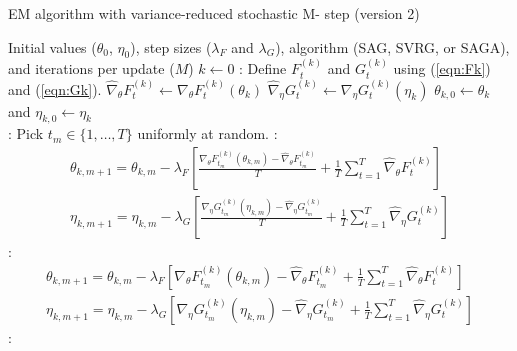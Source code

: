 \begin{algorithm}
\caption{EM algorithm with variance-reduced stochastic M- step (version 2)}\label{alg:EM-SO-v2}
\begin{algorithmic}[1]
\Require Initial values ($\theta_{0}$, $\eta_{0}$), step sizes ($\lambda_F$ and $\lambda_G$), algorithm (SAG, SVRG, or SAGA), and iterations per update ($M$)
%
\State $k \leftarrow 0$
%
:
    \State Define $F_t^{(k)}$ and $G_t^{(k)}$ using (\ref{eqn:Fk}) and (\ref{eqn:Gk}). 
    \State $\widehat \nabla_\theta F_t^{(k)} \leftarrow \nabla_\theta F_t^{(k)} (\theta_k)$
    \State $\widehat \nabla_\eta G_t^{(k)} \leftarrow \nabla_\eta G_t^{(k)} (\eta_k)$ 
\EndFor
%
\State $\theta_{k,0} \leftarrow \theta_k$ and $\eta_{k,0} \leftarrow \eta_k$
%
\\
%
%
:
    \State Pick $t_m \in \{1,\ldots,T\}$ uniformly at random.
    :
        \begin{gather}
            \theta_{k,m+1} = \theta_{k,m} - \lambda_F \left[\frac{\nabla_\theta F_{t_m}^{(k)}(\theta_{k,m}) - \widehat \nabla_\theta F_{t_m}^{(k)}}{T} + \frac{1}{T} \sum_{t=1}^T \widehat \nabla_\theta F^{(k)}_{t} \right] \\
            \eta_{k,m+1} = \eta_{k,m} - \lambda_G \left[\frac{\nabla_\eta G_{t_m}^{(k)}(\eta_{k,m}) - \widehat \nabla_\eta G_{t_m}^{(k)}}{T} + \frac{1}{T} \sum_{t=1}^T \widehat \nabla_\eta G^{(k)}_{t} \right]
        \end{gather}
    :
        \begin{gather}
            \theta_{k,m+1} = \theta_{k,m} - \lambda_F \left[\nabla_\theta F_{t_m}^{(k)}(\theta_{k,m}) - \widehat \nabla_\theta F_{t_m}^{(k)} + \frac{1}{T} \sum_{t=1}^T \widehat \nabla_\theta F^{(k)}_{t} \right] \\
            \eta_{k,m+1} = \eta_{k,m} - \lambda_G \left[\nabla_\eta G_{t_m}^{(k)}(\eta_{k,m}) - \widehat \nabla_\eta G_{t_m}^{(k)} + \frac{1}{T} \sum_{t=1}^T \widehat \nabla_\eta G^{(k)}_{t} \right]
        \end{gather}
    \EndIf
    :
        \begin{gather}

\end{gather}
\end{algorithmic}
\end{algorithm}
